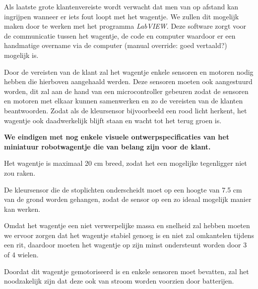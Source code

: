 \documentclass[12pt]{article}
\begin{document}
		
	    Als laatste grote klantenvereiste wordt verwacht dat men van op afstand kan ingrijpen wanneer er iets fout loopt met het wagentje. We zullen dit mogelijk maken door te werken met het programma \textit{LabVIEW}.
	    Deze software zorgt voor de communicatie tussen het wagentje, de code en computer waardoor er een handmatige overname via de computer (manual override: goed vertaald?) mogelijk is. 
	
	
	
	Door de vereisten van de klant zal het wagentje enkele sensoren en motoren nodig hebben die hierboven aangehaald werden.
	Deze sensoren moeten ook aangestuurd worden, dit zal aan de hand van een microcontroller gebeuren zodat de sensoren en motoren met elkaar kunnen samenwerken en zo de vereisten van de klanten beantwoorden.
	Zodat als de kleursensor bijvoorbeeld een rood licht herkent, het wagentje ook daadwerkelijk blijft staan en wacht tot het terug groen is.
	
	\textbf{We eindigen met nog enkele visuele ontwerpspecificaties van het miniatuur robotwagentje die van belang zijn voor de klant.}
	
	
		Het wagentje is maximaal 20 cm breed, zodat het een mogelijke tegenligger niet zou raken.
		
		
		De kleursensor die de stoplichten onderscheidt moet op een hoogte van 7.5 cm van de grond worden gehangen, zodat de sensor op een zo ideaal mogelijk manier kan werken.
		
		
		Omdat het wagentje een niet verwerpelijke massa en snelheid zal hebben moeten we ervoor zorgen dat het wagentje stabiel genoeg is en niet zal omkantelen tijdens een rit, daardoor moeten het wagentje op zijn minst
		ondersteunt worden door 3 of 4 wielen.
		
		
		Doordat dit wagentje gemotoriseerd is en enkele sensoren moet bevatten, zal het noodzakelijk zijn dat deze ook van stroom worden voorzien door batterijen.
\end{document}
